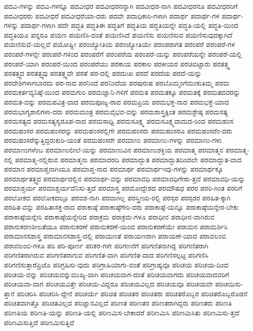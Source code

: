 {ಪದವಿ-ಗಳನ್ನು
ಪದವಿ-ಗಳನ್ನೂ
ಪದವೀಧರ
ಪದವೀಧರನನ್ನಾಗಿ
ಪದವೀಧರ-ನಾಗಿ
ಪದವೀಧರನೂ
ಪದವೀಧರರಿಗೆ
ಪದವೀಧರರು
ಪದವೀಧರೆ
ಪದವೀಧರೆಯಾ-ದರು
ಪದವೇ
ಪದಾಧಿಕಾರಿ-ಗಳಾಗಿ
ಪದಾರ್ಥ
ಪದಾರ್ಥ-ಗಳ
ಪದಾರ್ಥ-ಗಳನ್ನು
ಪದಾರ್ಥ-ಗಳಾಗಿ
ಪದೇ
ಪದ್ಧತಿ
ಪದ್ಧತಿಈ
ಪದ್ಧತಿಗೆ
ಪದ್ಧತಿಯ
ಪದ್ಧತಿಯನ್ನೇ
ಪದ್ಧತಿ-ಯಲ್ಲಿ
ಪದ್ಧತಿ-ಯಿಂದ
ಪದ್ಧತಿಯೂ
ಪನ್ನರೂ
ಪಯಣ
ಪಯಣಿಸಿ-ದಂತೆ
ಪಯಣಿಸಿದೆ
ಪಯಣಿಸು
ಪಯಣಿಸುವ
ಪಯಣಿಸುವುದಕ್ಕಾಗಿದೆ
ಪಯಣಿಸುವೆ-ಯಲ್ಲವೆ
ಪಯೋಷ್ಣೀ
ಪರಂಜ್ಯೋತಿಯ
ಪರಂಜ್ಯೋತಿಯೇ
ಪರಂಪರಾಗತ
ಪರಂಪರೆ
ಪರಂಪರೆ-ಗಳ
ಪರಂಪರೆ-ಗಳನ್ನೇ
ಪರಂಪರೆ-ಗಳಿಂದ
ಪರಂಪರೆಗೆ
ಪರಂಪರೆಯ
ಪರಂಪರೆ-ಯನ್ನು
ಪರಂಪರೆಯನ್ನೇ
ಪರಂಪರೆ-ಯಲ್ಲಿ
ಪರಂಪರೆ-ಯಾಗಿ
ಪರಂಪರೆ-ಯಿಂದ
ಪರಂಪರೆಯು
ಪರಕಾಯ
ಪರಕಾಲ
ಪರಕೀಯರ
ಪರಚಿಬಿಟ್ಟಾರು
ಪರತತ್ತ್ವ
ಪರತತ್ತ್ವದ
ಪರತತ್ತ್ವವು
ಪರತತ್ತ್ವವೇ
ಪರತೆ
ಪರ-ದಲ್ಲಿ
ಪರದುಃಖ
ಪರದೆ
ಪರದೆಯ
ಪರದೆ-ಯನ್ನು
ಪರದೇಶಿಗಳಾಗಬಾರದು
ಪರ-ನಾದ
ಪರನಿಂದೆ
ಪರನಿಂದೆಯ
ಪರಪುರುಷ
ಪರಬೊಮ್ಮಂಗೆಮಂಕುತಿಮ್ಮ
ಪರಮ
ಪರಮಕರ್ತವ್ಯನಿಷ್ಠೆ-ಯಿಂದ
ಪರಮಗುರಿ
ಪರಮಜ್ಞಾನಿ-ಗಳಿಗೆ
ಪರಮತ
ಪರಮತಕ್ಕೂ
ಪರಮತಕ್ಕೆ
ಪರಮತದವರನ್ನು
ಪರಮತ-ವನ್ನು
ಪರಮಪವಿತ್ರ-ವಾದ
ಪರಮಪೂಜ್ಯ-ರಾದ
ಪರಮಪ್ರಿಯ
ಪರಮಭಕ್ತ-ನಾದ
ಪರಮಭಕ್ತೆ-ಯಾದ
ಪರಮಭಾಗ್ಯಶಾಲಿಗಳಾ-ದರು
ಪರಮಮಂತ್ರ
ಪರಮವೈಭವ-ವನ್ನು
ಪರಮಶಾಸ್ತ್ರಕ್ಕಿಂತ
ಪರಮಶ್ರೇಷ್ಠ
ಪರಮಸತ್ಯ
ಪರಮಸತ್ಯದ
ಪರಮಸತ್ಯಸ್ವರೂಪ-ನಾದ
ಪರಮಸಾಧ್ವಿ
ಪರಮಸೂಕ್ಷ್ಮ
ಪರಮಸೂಕ್ಷ್ಮವಾದುದ-ರಿಂದ
ಪರಮಹಂಸ
ಪರಮಹಂಸರ
ಪರಮಹಂಸರನ್ನು
ಪರಮಹಂಸರಲ್ಲಿಗೇ
ಪರಮಹಂಸರು
ಪರಮಹಂಸರೂ
ಪರಮಹಂಸರೆಂ-ದರು
ಪರಮಹಂಸರೆನ್ನುತ್ತಿದ್ದರುಕುರಿ-ಯಂತೆ
ಪರಮಹಂಸರೇ
ಪರಮಾಣು
ಪರಮಾಣು-ಗಳನ್ನು
ಪರಮಾಣು-ಗಳು
ಪರಮಾಣುಗಳೆಂಬ
ಪರಮಾಣುಲೀಲೆ-ಯನ್ನು
ಪರಮಾಣುವಿನ
ಪರಮಾಣುಶಕ್ತಿಯ
ಪರಮಾತ್ಮ
ಪರಮಾತ್ಮನ
ಪರಮಾತ್ಮ-ನಲ್ಲಿ
ಪರಮಾತ್ಮ-ನಲ್ಲಿರುವ
ಪರಮಾತ್ಮನು
ಪರಮಾದರದಿ
ಪರಮಾದ್ಭುತ
ಪರಮಾದ್ಭುತದಿಂದಲೇ
ಪರಮಾದ್ಭುತ-ವಾದ
ಪರಮಾನ
ಪರಮಾಪ್ತನಾಗಿಯೂ
ಪರಮಾಪ್ತ-ನಾದ
ಪರಮಾರ್ಥ
ಪರಮಾರ್ಥಇವು-ಗಳನ್ನು
ಪರಮಾರ್ಥಕ್ಕೂ
ಪರಮಾರ್ಥತತ್ತ್ವದ
ಪರಮಾರ್ಥದಲ್ಲಿನ
ಪರಮಾರ್ಥ-ವನ್ನು
ಪರಮಾವಧಿ
ಪರಮಾವಧಿಗೇರು-ತ್ತದೆ
ಪರಮಾವಧಿ-ಯನ್ನು
ಪರಮಾಶ್ಚರ್ಯ
ಪರಮಾಶ್ಚರ್ಯವೆನಿಸು-ತ್ತದೆ
ಪರಮಾಸ್ತ್ರ
ಪರಮೋದ್ದೇಶದ
ಪರಮೌಷಧ
ಪರರ
ಪರರಿ-ಗಿಂತ
ಪರರಿಗೆ
ಪರಲೋಕದ
ಪರಲೋಕದಲ್ಲೂ
ಪರವಶ-ನಾಗಿ
ಪರವಾಗಿಲ್ಲ
ಪರಸ್ತ್ರೀಯ-ರಲ್ಲಿ
ಪರಸ್ಪರ
ಪರಸ್ಪರರ
ಪರಹಿತ-ಕ್ಕಾಗಿ
ಪರಹಿತ-ವನ್ನು
ಪರಹಿತಾಸಕ್ತ-ರಾದ
ಪರಾಕಾಷ್ಠೆ
ಪರಾಕಾಷ್ಠೆಗೇರಿ-ದರು
ಪರಾಕಾಷ್ಠೆ-ಯನ್ನೂ
ಪರಾಕಾಷ್ಠೆಯನ್ನೇರ-ಬೇಕು
ಪರಾಕಾಷ್ಠೆಯನ್ನೇರಿ
ಪರಾಕಾಷ್ಠೆಯನ್ನೇರಿದ
ಪರಾಕ್ರಮ
ಪರಾಕ್ರಮ-ಗಳೂ
ಪರಾಧೀನ
ಪರಾಧೀನ-ವಾಗಿರುವ
ಪರಾನುಕರಣಶೀಲತೆಯೂ
ಪರಾನುಕರಣೆ
ಪರಾನುಕರಣೆ-ಯಿಂದ
ಪರಾನುಕರಣೆಯೇ
ಪರಾಮನ
ಪರಾಮರ್ಶಿಸಿ
ಪರಾಮಾನಸಶಾಸ್ತ್ರ
ಪರಾಮಾನಸಶಾಸ್ತ್ರ-ದಲ್ಲಿ
ಪರಾಯಣತೆ
ಪರಾಯಣರಾಗಿ
ಪರಾಯಣೆ-ಯಾದ
ಪರಾವಲಂಬಿ
ಪರಾವಲಂಬಿ-ಗಳೂ
ಪರಿ
ಪರಿ-ಪೂರ್ಣ
ಪರಿಕರ-ಗಳೇ
ಪರಿಗಣನೆಗೆ
ಪರಿಗಣಿತನಾಗಿದ್ದ
ಪರಿಗಣಿತರಾಗಿ
ಪರಿಗಣಿತರಾಗಿರುವ
ಪರಿಗಣಿತರಾಗುವ
ಪರಿಗಣಿತ-ವಾಗಿ
ಪರಿಗಣಿತ-ವಾದ
ಪರಿಗಣಿಸಲ್ಪಟ್ಟ
ಪರಿಗಣಿಸಿ
ಪರಿಗಣಿಸುತ್ತಾರೆಪ್ರಿಜೊ
ಪರಿಗ್ರಹಿಸು-ವುದು
ಪರಿಗ್ರಾಹಿಯಾಗು-ವಂತೆ
ಪರಿಗ್ರಾಹ್ಯವೂ
ಪರಿಚಯ
ಪರಿಚಯ-ದಿಂದ
ಪರಿಚಯ-ವನ್ನು
ಪರಿಚಯವನ್ನುಮುಖ್ಯ-ವಾಗಿ
ಪರಿಚಯವಾಗ-ದಂತೆ
ಪರಿಚಯವಾಗದು
ಪರಿಚಯವಾದವರಿಗೆ
ಪರಿಚಯವಾ-ದಾಗ
ಪರಿಚಯವಿತ್ತೇ
ಪರಿಚಯ-ವಿದ್ದರೂ
ಪರಿಚಯವಿಲ್ಲದ
ಪರಿಚಯವೂ
ಪರಿಚಯವೇ
ಪರಿಚಯಿಸು-ತ್ತಾನೆ
ಪರಿಚರಿಸಿ
ಪರಿಚರಿಸಿ-ದ್ದೇನೆ
ಪರಿಚರ್ಯೆ
ಪರಿಚಿತ
ಪರಿಚಿತರ
ಪರಿಚಿತರು
ಪರಿಚಿತರೊಬ್ಬರ
ಪರಿಚಿತರೊಬ್ಬರೊಡನೆ
ಪರಿಚಿತವಾಗಿತ್ತೊ
ಪರಿಚಿತವಿಲ್ಲದ
ಪರಿಜ್ಞಾನವಿಲ್ಲದೆ
ಪರಿಣತ
ಪರಿಣತರ
ಪರಿಣತರಾಗಿದ್ದರು
ಪರಿಣತರು
ಪರಿಣತಿ
ಪರಿಣತಿಯ
ಪರಿಣತಿ-ಯನ್ನು
ಪರಿಣತಿ-ಯಲ್ಲಿ
ಪರಿಣಮಿಸ-ಬೇಕಾದರೆ
ಪರಿಣಮಿಸಿ
ಪರಿಣಮಿಸಿತು
ಪರಿಣಮಿಸು-ತ್ತದೆ
ಪರಿಣಮಿಸುತ್ತಿದೆ
ಪರಿಣಮಿಸುತ್ತಿವೆ
}
